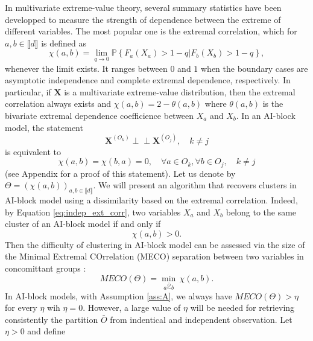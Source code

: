 \documentclass[11pt]{article}
\newcommand{\indep}{\perp \!\!\! \perp}
\begin{document}
	In multivariate extreme-value theory, several summary statistics have been developped to measure the strength of dependence between the extreme of different variables. The most popular one is the extremal correlation, which for $a,b \in \llbracket d \rrbracket$ is defined as 
	\begin{equation}
		\label{eq:ext_correlation}
		\chi(a,b) = \underset{q \rightarrow 0}{\lim} \mathbb{P}\left\{ F_a(X_a) > 1-q | F_b(X_b) > 1-q \right\},
	\end{equation}
	whenever the limit exists. It ranges between $0$ and $1$ when the boundary cases are asymptotic independence and complete extremal dependence, respectively. In particular, if $\textbf{X}$ is a multivariate extreme-value distribution, then the extremal correlation always exists and $\chi(a,b) = 2 - \theta(a,b)$ where $\theta(a,b)$ is the bivariate extremal dependence coefficience between $X_a$ and $X_b$. In an AI-block model, the statement
	\begin{equation*}
		\textbf{X}^{(O_k)} \indep \textbf{X}^{(O_j)}, \quad k \neq j
	\end{equation*}
	is equivalent to
	\begin{equation}
		\label{eq:indep_ext_corr}
		\chi(a,b) = \chi(b,a) = 0, \quad \forall a \in O_k, \forall b \in O_j, \quad k \neq j
	\end{equation}
	(see Appendix for a proof of this statement). Let us denote by $\Theta = (\chi(a,b))_{a,b \in \llbracket d \rrbracket}$. We will present an algorithm that recovers clusters in AI-block model using a dissimilarity based on the extremal correlation. Indeed, by Equation \eqref{eq:indep_ext_corr}, two variables $X_a$ and $X_b$ belong to the same cluster of an AI-block model if and only if
	\begin{equation*}
	 \chi(a,b) > 0.
	\end{equation*}
	Then the difficulty of clustering in AI-block model can be assessed via the size of the Minimal Extremal COrrelation (MECO) separation between two variables in concomittant groups :
	\begin{equation}
		\label{eq:MECO}
		MECO(\Theta) = \underset{a \overset{\bar{O}}{\sim} b}{\min} \, \chi(a,b).
	\end{equation}
	In AI-block models, with Assumption \ref{ass:A}, we always have $MECO(\Theta) > \eta$ for every $\eta$ wih $\eta = 0$. However, a large value of $\eta$ will be needed for retrieving consistently the partition $\bar{O}$ from indentical and independent observation. Let $\eta > 0$ and define
\end{document}
